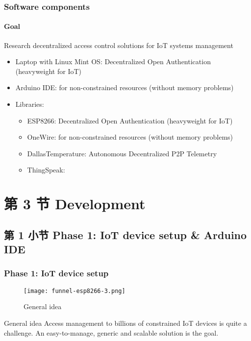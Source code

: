 \documentclass[
    aspectratio=169,                   %
]{beamer}
\begin{document}
    \begin{frame}
        \frametitle{Software components}

        \paragraph{Goal} Research decentralized access control solutions for IoT systems management

        \begin{itemize}
            \item \alert{Laptop with Linux Mint OS}: Decentralized Open Authentication (heavyweight for IoT)
            \item \alert{Arduino IDE}: for non-constrained resources (without memory problems)\cite{arduinoide}
            \item \alert{Libraries:}
            \begin{itemize}
                \item \alert{ESP8266}: Decentralized Open Authentication (heavyweight for IoT)
                \item \alert{OneWire}: for non-constrained resources (without memory problems)
                \item \alert{DallasTemperature}: Autonomous Decentralized P2P Telemetry   
                \item \alert{ThingSpeak}:      
            \end{itemize}
        \end{itemize}

    \end{frame}

\section{第 3 节 Development}

\subsection{第 1 小节 Phase 1: IoT device setup \& Arduino IDE}

    \begin{frame}
        \frametitle{Phase 1: IoT device setup}

        \begin{figure}
            \centering
            \begin{stampbox}
                \texttt{[image: funnel-esp8266-3.png]}
            \end{stampbox}
            \caption{General idea}
        \end{figure}
        
        \begin{block}{General idea}
            Access management to billions of constrained IoT devices is quite a challenge. An easy-to-manage, generic and scalable solution is the goal.
        \end{block}

    \end{frame}
\end{document}

